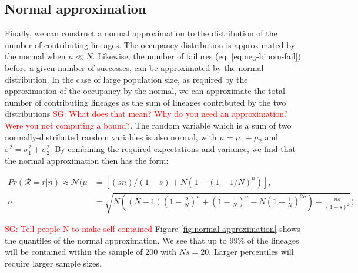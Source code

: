 \documentclass[review]{elsarticle}
\newcommand{\sgcomment}[1]{\textcolor{red}{SG: #1}}
\begin{document}
\subsection{Normal approximation}

Finally, we can construct a normal approximation to the distribution of the number of contributing
lineages. The occupancy distribution is approximated by the normal \citep{ONeill2019} when $n \ll N$.
Likewise, the number of failures (eq. \eqref{eq:neg-binom-fail}) before a given number of successes,
can be approximated by the normal distribution. In the case of large population size, as required by
the approximation of the occupancy by the normal, we can approximate the total number of
contributing lineages as the sum of lineages contributed by the two distributions \sgcomment{What does that mean? Why do you need an approximation? Were you not computing a bound?}. The random
variable which is a sum of two normally-distributed random variables is also normal, with
$\mu=\mu_1+\mu_2$ and $\sigma^2 = \sigma^2_1 + \sigma^2_2$. By combining the required expectations
and variance, we find that the normal approximation then has the form:

\begin{align}
  \label{eq:normal-approximation}
  Pr(\mathcal{R}=r|n) \approx \mathcal{N}( \mu &= \left[(s n)/(1 - s) + N (1 - (1 - 1/N)^n)\right],\\
  \sigma &= \sqrt{N \left((N-1) \left(1-\frac{2}{N}\right)^n+\left(1-\frac{1}{N}\right)^n-N\left(1-\frac{1}{N}\right)^{2 n}\right)+\frac{n s}{(1-s)^2}})
\end{align}

\sgcomment{Tell people N to make self contained} Figure \ref{fig:normal-approximation} shows the quantiles of the normal approximation. We see that
up to $99\%$ of the lineages will be contained within the sample of 200 with $Ns=20$. Larger
percentiles will require larger sample sizes.
\end{document}

